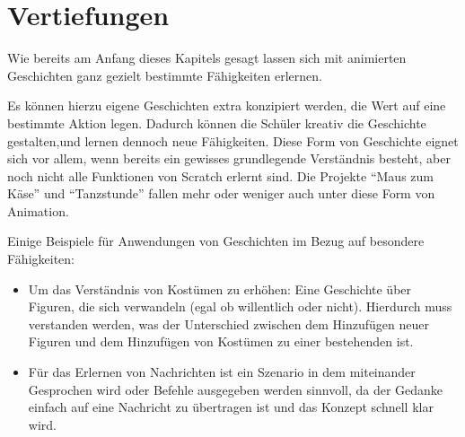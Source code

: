 \section{Vertiefungen}\label{vertiefungen}

Wie bereits am Anfang dieses Kapitels gesagt lassen sich mit animierten
Geschichten ganz gezielt bestimmte Fähigkeiten erlernen.

Es können hierzu eigene Geschichten extra konzipiert werden, die Wert
auf eine bestimmte Aktion legen. Dadurch können die Schüler kreativ die
Geschichte gestalten,und lernen dennoch neue Fähigkeiten. Diese Form von
Geschichte eignet sich vor allem, wenn bereits ein gewisses
grundlegende Verständnis besteht, aber noch nicht alle Funktionen von Scratch
erlernt sind. Die Projekte ``Maus zum Käse'' und ``Tanzstunde'' fallen
mehr oder weniger auch unter diese Form von Animation.

Einige Beispiele für Anwendungen von Geschichten im Bezug auf besondere
Fähigkeiten:

\begin{itemize}
\item
  Um das Verständnis von Kostümen zu erhöhen: Eine Geschichte über
  Figuren, die sich verwandeln (egal ob willentlich oder nicht).
  Hierdurch muss verstanden werden, was der Unterschied zwischen dem
  Hinzufügen neuer Figuren und dem Hinzufügen von Kostümen zu einer
  bestehenden ist.
\item
  Für das Erlernen von Nachrichten ist ein Szenario in dem miteinander
  Gesprochen wird oder Befehle ausgegeben werden sinnvoll, da der
  Gedanke einfach auf eine Nachricht zu übertragen ist und das Konzept
  schnell klar wird.
\end{itemize}
